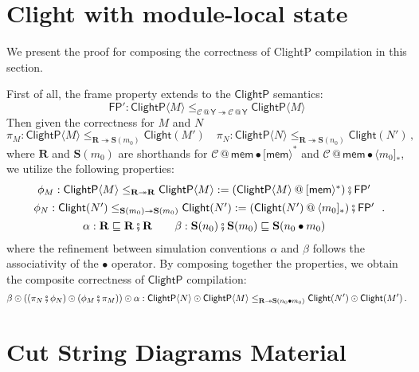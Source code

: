\documentclass[acmsmall,screen,review,anonymous]{acmart}
\newcommand{\kw}[1]{\ensuremath{ \mathsf{#1} }}
\newcommand{\caller}[1]{\langle #1 ]}
\newcommand{\callee}[1]{[ #1 \rangle}
\newcommand{\jr}{\mathsf{Y}}
\newcommand{\vcomp}{\fatsemi}
\begin{document}
\section{Clight with module-local state} \label{sec:appendix:clightp} %

\newcommand{\clightp}[1]{\kw{ClightP} \langle #1 \rangle}

We present the proof for
composing the correctness of ClightP compilation
in this section.

First of all,
the frame property extends to the $\kw{ClightP}$ semantics:
\[
  \kw{FP'}: \clightp{M} \le_{\mathcal{C} \mathbin@ \jr \twoheadrightarrow \mathcal{C} \mathbin@ \jr} \clightp{M}
\]
Then given the correctness for $M$ and $N$
\[
  \pi_M: \clightp{M} \le_{\mathbf{R} \twoheadrightarrow \mathbf{S}(m_0)} \kw{Clight}(M')
  \quad
  \pi_N: \clightp{N} \le_{\mathbf{R} \twoheadrightarrow \mathbf{S}(n_0)} \kw{Clight}(N')
  \,,
\]
where $\mathbf{R}$ and $\mathbf{S}(m_0)$ are shorthands for
$\mathcal{C} \mathbin@ \kw{mem} \bullet \callee{\kw{mem}}^*$
and
$\mathcal{C} \mathbin@ \kw{mem} \bullet \caller{m_0}_*$,
we utilize the following properties:
\[
  \begin{array}{c}
    \phi_M : \clightp{M} \le_{\mathbf{R} \twoheadrightarrow \mathbf{R}} \clightp{M}
    := (\clightp{M} \mathbin@ \callee{\kw{mem}}^*) \vcomp \kw{FP'}  \\[1ex]
    \phi_N : \kw{Clight}(N') \le_{\mathbf{S}(m_0) \twoheadrightarrow \mathbf{S}(m_0)} \kw{Clight}(N')
    := (\kw{Clight}(N') \mathbin@ \caller{m_0}_*) \vcomp \kw{FP'} \\[1ex]
    \alpha : \mathbf{R} \sqsubseteq \mathbf{R} \vcomp \mathbf{R}
    \qquad
    \beta : \mathbf{S}(n_0) \vcomp \mathbf{S}(m_0) \sqsubseteq \mathbf{S}(n_0 \bullet m_0)
  \end{array}
  \,.
\]
where the refinement between simulation conventions $\alpha$ and $\beta$ follows
the associativity of the $\bullet$ operator.
By composing together the properties,
we obtain the composite correctness of \kw{ClightP} compilation:
\[
  \beta \odot ((\pi_N \vcomp \phi_N) \odot (\phi_M \vcomp \pi_M) ) \odot \alpha :
  \clightp{N} \odot \clightp{M} \le_{\mathbf{R} \twoheadrightarrow \mathbf{S}(n_0 \bullet m_0)} \kw{Clight}(N') \odot \kw{Clight}(M')
  \,.
\]



\section{Cut String Diagrams Material} %
\end{document}
